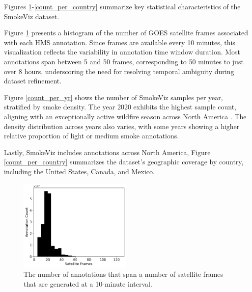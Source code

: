 \documentclass{article}
\begin{document}
Figures \ref{num_frames}-\ref{count_per_country} summarize key statistical characteristics of the SmokeViz dataset.

Figure \ref{num_frames} presents a histogram of the number of GOES satellite frames associated with each HMS annotation. Since frames are available every 10 minutes, this visualization reflects the variability in annotation time window duration. Most annotations span between 5 and 50 frames, corresponding to 50 minutes to just over 8 hours, underscoring the need for resolving temporal ambiguity during dataset refinement.

Figure \ref{count_per_yr} shows the number of SmokeViz samples per year, stratified by smoke density. The year 2020 exhibits the highest sample count, aligning with an exceptionally active wildfire season across North America \cite{fires2020}. The density distribution across years also varies, with some years showing a higher relative proportion of light or medium smoke annotations.

Lastly, SmokeViz includes annotations across North America, Figure \ref{count_per_country} summarizes the dataset's geographic coverage by country, including the United States, Canada, and Mexico.



\begin{figure}[!htb]
    \centering
        \includegraphics[width=0.49\textwidth]{stat_figs/sample_count_vs_frames.png}
        \caption{The number of annotations that span a number of satellite frames that are generated at a 10-minute interval.}
        \label{num_frames}
\end{figure}
\end{document}
